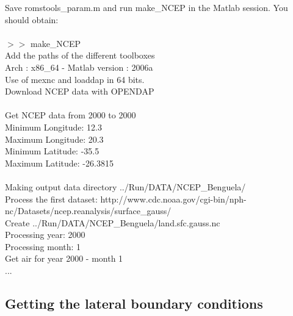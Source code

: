 Save romstools\_param.m and run make\_NCEP in the Matlab session.
You should obtain:
\\\\
$>>$ make\_NCEP\\
Add the paths of the different toolboxes\\
Arch : x86\_64 - Matlab version : 2006a\\
Use of mexnc and loaddap in 64 bits.\\
Download NCEP data with OPENDAP\\
\\
Get NCEP data from 2000 to 2000\\
Minimum Longitude: 12.3\\
Maximum Longitude: 20.3\\
Minimum Latitude: -35.5\\
Maximum Latitude: -26.3815\\
\\
Making output data directory ../Run/DATA/NCEP\_Benguela/\\
Process the first dataset: http://www.cdc.noaa.gov/cgi-bin/nph-nc/Datasets/ncep.reanalysis/surface\_gauss/\\
    Create ../Run/DATA/NCEP\_Benguela/land.sfc.gauss.nc\\
Processing year: 2000\\
  Processing month: 1\\
    Get air for year 2000 - month 1\\
...

\subsection{Getting the lateral boundary conditions}

